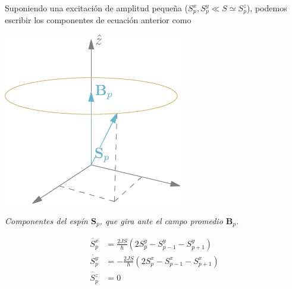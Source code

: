 \documentclass{tufte-book}
\begin{document}
Suponiendo una excitación de amplitud pequeña ($S_p^x,S_p^y ≪ S ≃
S_p^z$), podemos escribir los componentes de ecuación anterior como
\begin{marginfigure}
  \centering
  \includegraphics{figures/spin.pdf}
  \caption{\itshape Componentes del espín $\symbf{S}_p$, que gira ante el
    campo promedio $\symbf{B}_p$.}
  \label{fig:spin}
\end{marginfigure}
\begin{equation}
  \begin{split}
    \dot{S_p^x} &= \frac{2JS}{ℏ} (2S_p^y - S_{p-1}^y - S_{p+1}^y) \\
    \dot{S_p^y} &= -\frac{2JS}{ℏ} (2S_p^x - S_{p-1}^x - S_{p+1}^x) \\
    \dot{S_p^z} &= 0
  \end{split}
  \label{eq:systemloco}
\end{equation}
\end{document}
